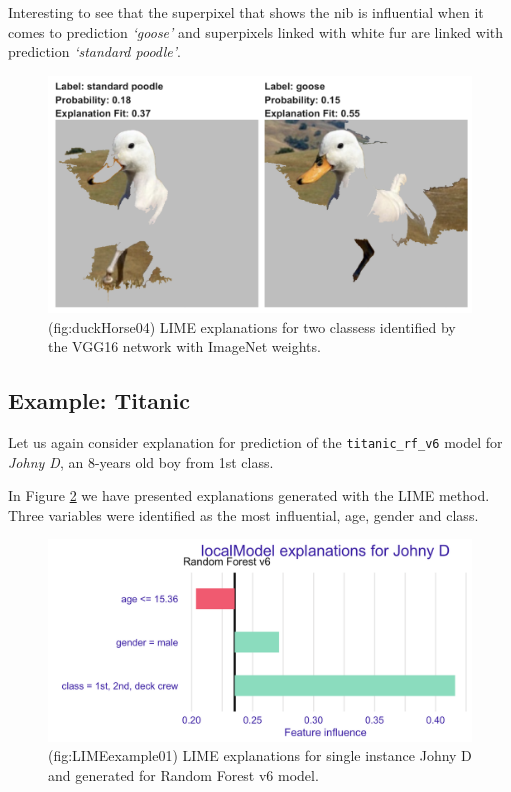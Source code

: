 \documentclass[12pt,]{krantz}
\theoremstyle{definition}
\theoremstyle{definition}
\theoremstyle{definition}
\theoremstyle{remark}
\begin{document}
Interesting to see that the superpixel that shows the nib is influential
when it comes to prediction \emph{`goose'} and superpixels linked with
white fur are linked with prediction \emph{`standard poodle'}.

\begin{figure}

{\centering \includegraphics[width=1\linewidth]{figure/duck_horse_04} 

}

\caption{(fig:duckHorse04) LIME explanations for two classess identified by the VGG16 network with ImageNet weights.}\label{fig:duckHorse04}
\end{figure}

\hypertarget{example-titanic-3}{%
\subsection{Example: Titanic}\label{example-titanic-3}}

Let us again consider explanation for prediction of the
\texttt{titanic\_rf\_v6} model for \emph{Johny D}, an 8-years old boy
from 1st class.

In Figure \ref{fig:LIMEexample01} we have presented explanations
generated with the LIME method. Three variables were identified as the
most influential, age, gender and class.

\begin{figure}

{\centering \includegraphics[width=0.6\linewidth]{figure/LIMEexample01} 

}

\caption{(fig:LIMEexample01) LIME explanations for single instance Johny D and generated for Random Forest v6 model.}\label{fig:LIMEexample01}
\end{figure}
\end{document}

